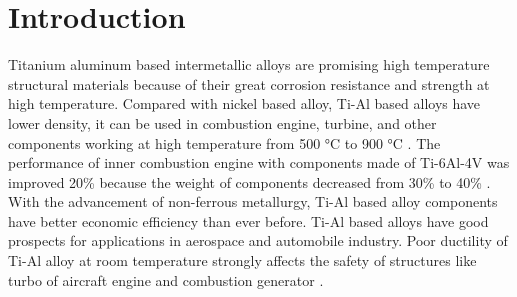 \documentclass[materials,article,submit,moreauthors,pdftex,10pt,a4paper]{Definitions/mdpi}
\begin{document}
\section{Introduction}
Titanium  aluminum based intermetallic alloys are promising high temperature structural materials because of their great corrosion resistance and strength at high temperature. Compared with nickel based alloy,  Ti-Al based alloys have lower density, it can be used in combustion engine, turbine, and other components working at high temperature from 500 \si{\degreeCelsius} to 900 \si{\degreeCelsius} \cite{Clemens2016}. The performance of inner combustion engine with components made of Ti-6Al-4V was improved  20\% because the weight of components decreased from 30\% to 40\% \cite{Bewlay2016}. With the advancement of non-ferrous metallurgy, Ti-Al based alloy components have better economic efficiency than ever before. Ti-Al based alloys have good prospects for applications in aerospace and automobile industry. 
Poor ductility of Ti-Al alloy  at room temperature strongly affects the safety of structures like turbo of aircraft engine and combustion generator \cite{Munz2017}. 
\end{document}
